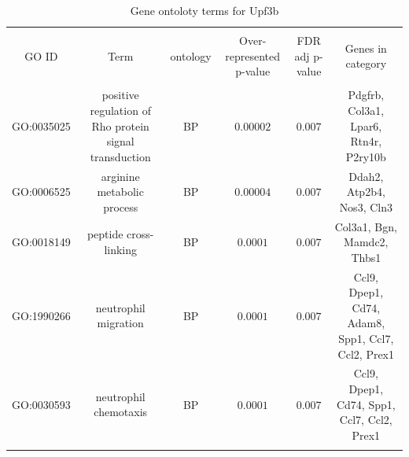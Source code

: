 
\begin{table}[!htbp] \centering 
  \caption{Gene ontoloty terms for Upf3b} 
  \label{} 
\begin{tabular}{@{\extracolsep{5pt}} cccccc} 
\\[-1.8ex]\hline 
\hline \\[-1.8ex] 
GO ID & Term & ontology & Over-represented p-value & FDR adj p-value & Genes in category \\ 
\hline \\[-1.8ex] 
GO:0035025 & positive regulation of Rho protein signal transduction & BP & $0.00002$ & $0.007$ & Pdgfrb, Col3a1, Lpar6, Rtn4r, P2ry10b \\ 
GO:0006525 & arginine metabolic process & BP & $0.00004$ & $0.007$ & Ddah2, Atp2b4, Nos3, Cln3 \\ 
GO:0018149 & peptide cross-linking & BP & $0.0001$ & $0.007$ & Col3a1, Bgn, Mamdc2, Thbs1 \\ 
GO:1990266 & neutrophil migration & BP & $0.0001$ & $0.007$ & Ccl9, Dpep1, Cd74, Adam8, Spp1, Ccl7, Ccl2, Prex1 \\ 
GO:0030593 & neutrophil chemotaxis & BP & $0.0001$ & $0.007$ & Ccl9, Dpep1, Cd74, Spp1, Ccl7, Ccl2, Prex1 \\ 
\hline \\[-1.8ex] 
\end{tabular} 
\end{table} 
